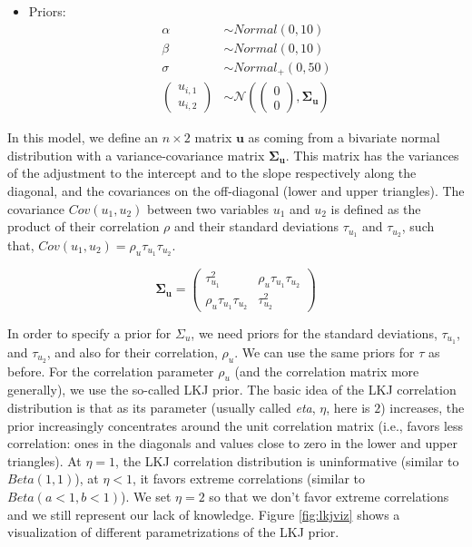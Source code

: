 \documentclass[12pt,]{krantz}
\providecommand{\tightlist}{%
  \setlength{\itemsep}{0pt}\setlength{\parskip}{0pt}}
\theoremstyle{definition}
\theoremstyle{definition}
\theoremstyle{definition}
\theoremstyle{remark}
\begin{document}
\begin{itemize}
\tightlist
\item
  Priors:
  \begin{equation}
   \begin{aligned}
   \alpha & \sim Normal(0,10) \\
   \beta  & \sim Normal(0,10) \\
    \sigma  &\sim Normal_+(0,50)\\
    {\begin{pmatrix}
    u_{i,1} \\
    u_{i,2}
    \end{pmatrix}}
   &\sim {\mathcal {N}}
    \left(
   {\begin{pmatrix} 
    0\\
    0
   \end{pmatrix}}
   ,\boldsymbol{\Sigma_u} \right)
   \end{aligned}
   \end{equation}
\end{itemize}

In this model, we define an \(n\times 2\) matrix \(\mathbf{u}\) as coming from a bivariate normal distribution with a variance-covariance matrix \(\boldsymbol{\Sigma_u}\). This matrix has the variances of the adjustment to the intercept and to the slope respectively along the diagonal, and the covariances on the off-diagonal (lower and upper triangles). The covariance \(Cov(u_1,u_2)\) between two variables \(u_1\) and \(u_2\) is defined as the product of their correlation \(\rho\) and their standard deviations \(\tau_{u_1}\) and \(\tau_{u_2}\), such that, \(Cov(u_1,u_2) = \rho_u \tau_{u_1} \tau_{u_2}\).

\begin{equation}
\boldsymbol{\Sigma_u} = 
{\begin{pmatrix} 
\tau_{u_1}^2 & \rho_u \tau_{u_1} \tau_{u_2} \\ 
\rho_u \tau_{u_1} \tau_{u_2} & \tau_{u_2}^2
\end{pmatrix}}
\end{equation}

In order to specify a prior for \(\Sigma_u\), we need priors for the standard deviations, \(\tau_{u_1}\), and \(\tau_{u_2}\), and also for their correlation, \(\rho_u\). We can use the same priors for \(\tau\) as before. For the correlation parameter \(\rho_u\) (and the correlation matrix more generally), we use the so-called LKJ prior. The basic idea of the LKJ correlation distribution is that as its parameter (usually called \emph{eta}, \(\eta\), here is \(2\)) increases, the prior increasingly concentrates around the unit correlation matrix (i.e., favors less correlation: ones in the diagonals and values close to zero in the lower and upper triangles). At \(\eta = 1\), the LKJ correlation distribution is uninformative (similar to \(Beta(1,1)\)), at \(\eta < 1\), it favors extreme correlations (similar to \(Beta(a<1,b<1)\)). We set \(\eta = 2\) so that we don't favor extreme correlations and we still represent our lack of knowledge. Figure \ref{fig:lkjviz} shows a visualization of different parametrizations of the LKJ prior.
\end{document}

